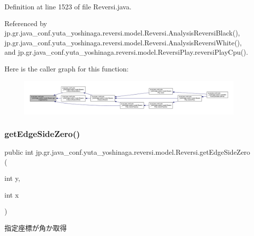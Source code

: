 Definition at line 1523 of file Reversi.\+java.



Referenced by jp.\+gr.\+java\+\_\+conf.\+yuta\+\_\+yoshinaga.\+reversi.\+model.\+Reversi.\+Analysis\+Reversi\+Black(), jp.\+gr.\+java\+\_\+conf.\+yuta\+\_\+yoshinaga.\+reversi.\+model.\+Reversi.\+Analysis\+Reversi\+White(), and jp.\+gr.\+java\+\_\+conf.\+yuta\+\_\+yoshinaga.\+reversi.\+model.\+Reversi\+Play.\+reversi\+Play\+Cpu().

Here is the caller graph for this function\+:
\nopagebreak
\begin{figure}[H]
\begin{center}
\leavevmode
\includegraphics[width=350pt]{classjp_1_1gr_1_1java__conf_1_1yuta__yoshinaga_1_1reversi_1_1model_1_1_reversi_afc0b642f56e39a28ab5adc48c8fd2b98_icgraph}
\end{center}
\end{figure}
\mbox{\label{classjp_1_1gr_1_1java__conf_1_1yuta__yoshinaga_1_1reversi_1_1model_1_1_reversi_a3989b051544745724fc372d4a6b8a7f7}} 
\subsubsection{\texorpdfstring{get\+Edge\+Side\+Zero()}{getEdgeSideZero()}}
{\footnotesize\ttfamily public int jp.\+gr.\+java\+\_\+conf.\+yuta\+\_\+yoshinaga.\+reversi.\+model.\+Reversi.\+get\+Edge\+Side\+Zero (\begin{DoxyParamCaption}\item[{int}]{y,  }\item[{int}]{x }\end{DoxyParamCaption})}



指定座標が角か取得 


